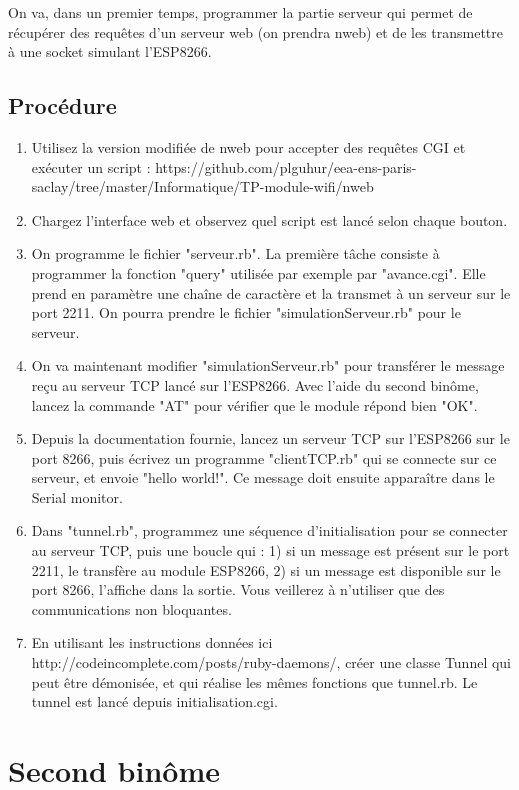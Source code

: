 \documentclass[abstracton]{scrartcl}
\begin{document}
On va, dans un premier temps, programmer la partie serveur qui permet de récupérer des requêtes d'un serveur web (on prendra nweb) et de les transmettre à une socket simulant l'ESP8266.

\subsection{Procédure}

\begin{enumerate}
    \item Utilisez la version modifiée de nweb pour accepter des requêtes CGI et exécuter un script : https://github.com/plguhur/eea-ens-paris-saclay/tree/master/Informatique/TP-module-wifi/nweb
    \item Chargez l'interface web et observez quel script est lancé selon chaque bouton.
    \item On programme le fichier "serveur.rb". La première tâche consiste à programmer la fonction "query" utilisée par exemple par "avance.cgi". Elle prend en paramètre une chaîne de caractère et la transmet à un serveur sur le port 2211. On pourra prendre le fichier "simulationServeur.rb" pour le serveur.
    \item On va maintenant modifier "simulationServeur.rb" pour transférer le message reçu au serveur TCP lancé sur l'ESP8266. Avec l'aide du second binôme, lancez la commande "AT" pour vérifier que le module répond bien "OK".
    \item Depuis la documentation fournie, lancez un serveur TCP sur l'ESP8266 sur le port 8266, puis écrivez un programme "clientTCP.rb" qui se connecte sur ce serveur, et envoie "hello world!". Ce message doit ensuite apparaître dans le Serial monitor.
    \item Dans "tunnel.rb", programmez une séquence d'initialisation pour se connecter au serveur TCP, puis une boucle qui : 1) si un message est présent sur le port 2211, le transfère au module ESP8266, 2) si un message est disponible sur le port 8266, l'affiche dans la sortie. Vous veillerez à n'utiliser que des communications non bloquantes.
    \item En utilisant les instructions données ici http://codeincomplete.com/posts/ruby-daemons/, créer une classe Tunnel qui peut être démonisée, et qui réalise les mêmes fonctions que tunnel.rb. Le tunnel est lancé depuis initialisation.cgi.
\end{enumerate}




\section{Second binôme}
\end{document}
